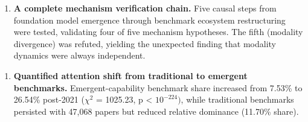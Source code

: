 \begin{enumerate}
\item \textbf{A complete mechanism verification chain.} Five causal steps from foundation model emergence through benchmark ecosystem restructuring were tested, validating four of five mechanism hypotheses. The fifth (modality divergence) was refuted, yielding the unexpected finding that modality dynamics were always independent.
\end{enumerate}

\begin{enumerate}
\item \textbf{Quantified attention shift from traditional to emergent benchmarks.} Emergent-capability benchmark share increased from 7.53\% to 26.54\% post-2021 ($\chi^2$ = 1025.23, p < $10^{-224})$, while traditional benchmarks persisted with 47,068 papers but reduced relative dominance (11.70\% share).
\end{enumerate}

